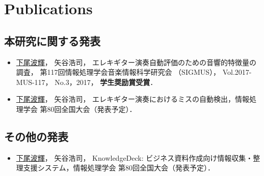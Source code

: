 \chapter*{Publications}

\section*{本研究に関する発表}
\begin{itemize}
\item\underline{下尾波輝}， 矢谷浩司， エレキギター演奏自動評価のための音響的特徴量の調査， 第117回情報処理学会音楽情報科学研究会 （SIGMUS）， Vol.2017-MUS-117， No.3，2017， \textbf{学生奨励賞受賞}．
\item\underline{下尾波輝}， 矢谷浩司， エレキギター演奏におけるミスの自動検出，情報処理学会 第80回全国大会（発表予定）．
\end{itemize}

\section*{その他の発表}
\begin{itemize}
\item\underline{下尾波輝}， 矢谷浩司， KnowledgeDeck: ビジネス資料作成向け情報収集・整理支援システム，情報処理学会 第80回全国大会（発表予定）．
\end{itemize}